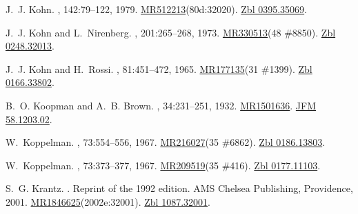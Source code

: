 \documentclass[11pt,a4paper, final, twoside]{article}
\numberwithin{equation}{section}
\begin{document}
\begin{appendices}
\begin{thebibliography}{100}
J.~J. Kohn.
, 142:79--122, 1979.
\newblock
  \href{http://www.ams.org/mathscinet-getitem?mr=512213}{MR512213}(80d:32020).
  \href{http://zbmath.org/?q=an:0395.35069}{Zbl 0395.35069}.

J.~J. Kohn and L.~Nirenberg.
, 201:265--268, 1973.
\newblock \href{http://www.ams.org/mathscinet-getitem?mr=330513}{MR330513}(48
  \#8850). \href{http://zbmath.org/?q=an:0248.32013}{Zbl 0248.32013}.

J.~J. Kohn and H.~Rossi.
, 81:451--472, 1965.
\newblock \href{http://www.ams.org/mathscinet-getitem?mr=177135}{MR177135}(31
  \#1399). \href{http://zbmath.org/?q=an:0166.33802}{Zbl 0166.33802}.

B.~O. Koopman and A.~B. Brown.
,
  34:231--251, 1932.
\newblock \href{http://www.ams.org/mathscinet-getitem?mr=1501636}{MR1501636}.
  \href{http://zbmath.org/?q=an:58.1203.02}{JFM 58.1203.02}.

W.~Koppelman.
, 73:554--556,
  1967.
\newblock \href{http://www.ams.org/mathscinet-getitem?mr=216027}{MR216027}(35
  \#6862). \href{http://zbmath.org/?q=an:0186.13803}{Zbl 0186.13803}.

W.~Koppelman.
, 73:373--377,
  1967.
\newblock \href{http://www.ams.org/mathscinet-getitem?mr=209519}{MR209519}(35
  \#416). \href{http://zbmath.org/?q=an:0177.11103}{Zbl 0177.11103}.

S.~G. Krantz.
.
\newblock Reprint of the 1992 edition. AMS Chelsea Publishing, Providence,
  2001.
\newblock
  \href{http://www.ams.org/mathscinet-getitem?mr=1846625}{MR1846625}(2002e:32001).
  \href{http://zbmath.org/?q=an:1087.32001}{Zbl 1087.32001}.


\end{thebibliography}
\end{appendices}
\end{document}
